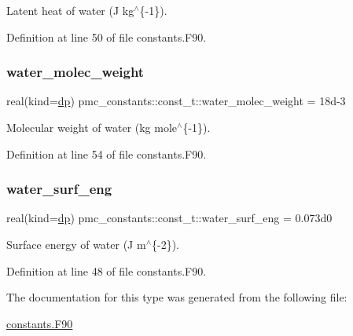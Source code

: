Latent heat of water (J kg$^\wedge$\{-\/1\}). 



Definition at line 50 of file constants.\+F90.

\mbox{\label{structpmc__constants_1_1const__t_a11c5b97533dded1ba8447d6215ca0d5f}} 
\subsubsection{\texorpdfstring{water\+\_\+molec\+\_\+weight}{water\_molec\_weight}}
{\footnotesize\ttfamily real(kind=\mbox{\hyperlink{namespacepmc__constants_a396b7709ed4da67dac74cb46a1466ed6}{dp}}) pmc\+\_\+constants\+::const\+\_\+t\+::water\+\_\+molec\+\_\+weight = 18d-\/3}



Molecular weight of water (kg mole$^\wedge$\{-\/1\}). 



Definition at line 54 of file constants.\+F90.

\mbox{\label{structpmc__constants_1_1const__t_a020a8bbab8ccd7c13642b17a774c9e21}} 
\subsubsection{\texorpdfstring{water\+\_\+surf\+\_\+eng}{water\_surf\_eng}}
{\footnotesize\ttfamily real(kind=\mbox{\hyperlink{namespacepmc__constants_a396b7709ed4da67dac74cb46a1466ed6}{dp}}) pmc\+\_\+constants\+::const\+\_\+t\+::water\+\_\+surf\+\_\+eng = 0.\+073d0}



Surface energy of water (J m$^\wedge$\{-\/2\}). 



Definition at line 48 of file constants.\+F90.



The documentation for this type was generated from the following file\+:\begin{DoxyCompactItemize}
\item 
\mbox{\hyperlink{constants_8_f90}{constants.\+F90}}\end{DoxyCompactItemize}
